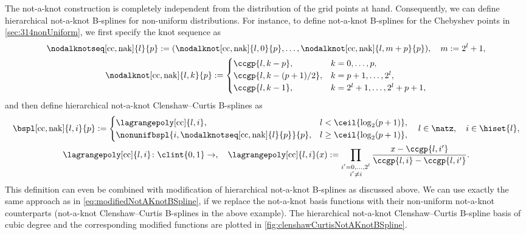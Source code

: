 The not-a-knot construction is completely independent from the
distribution of the grid points at hand.
Consequently, we can define hierarchical not-a-knot B-splines
for non-uniform distributions.
For instance, to define not-a-knot B-splines for the
Chebyshev points in \cref{sec:314nonUniform},
we first specify the knot sequence as
\begin{subequations}
  \begin{gather}
    \nodalknotseq[\cc,\nak]{l}{p}
    := (\nodalknot[\cc,\nak]{l,0}{p}, \dotsc,
    \nodalknot[\cc,\nak]{l,m+p}{p}),\quad
    m := 2^l + 1,\\
    \nodalknot[\cc,\nak]{l,k}{p}
    :=
    \begin{cases}
      \ccgp{l,k-p},&
      k = 0, \dotsc, p,\\
      \ccgp{l,k-(p+1)/2},&
      k = p + 1, \dotsc, 2^l,\\
      \ccgp{l,k-1},&
      k = 2^l + 1, \dotsc, 2^l + p + 1,
    \end{cases}
  \end{gather}
\end{subequations}
and then define hierarchical not-a-knot Clenshaw--Curtis B-splines as
\begin{subequations}
  \begin{gather}
    \bspl[\cc,\nak]{l,i}{p}
    :=
    \begin{cases}
      \lagrangepoly[\cc]{l,i},&
      l < \ceil{\log_2(p+1)},\\
      \nonunifbspl{i,\nodalknotseq[\cc,\nak]{l}{p}}{p},&
      l \ge \ceil{\log_2(p+1)},
    \end{cases}\quad
    l \in \natz,\quad
    i \in \hiset{l},\\
    \lagrangepoly[\cc]{l,i}\colon \clint{0, 1} \to \real,\quad
    \lagrangepoly[\cc]{l,i}(x)
    := \prod_{\substack{i'=0,\dotsc,2^l\\i'\not=i}}
    \frac{x - \ccgp{l,i'}}%
    {\ccgp{l,i} - \ccgp{l,i'}}.
  \end{gather}
\end{subequations}
This definition can even be combined with modification
of hierarchical not-a-knot B-splines as discussed above.
We can use exactly the same approach as in
\eqref{eq:modifiedNotAKnotBSpline}, if we replace the
not-a-knot basis functions with their non-uniform not-a-knot counterparts
(not-a-knot Clenshaw--Curtis B-splines in the above example).
The hierarchical not-a-knot Clenshaw--Curtis B-spline basis of
cubic degree and the corresponding modified functions are plotted in
\cref{fig:clenshawCurtisNotAKnotBSpline}.

